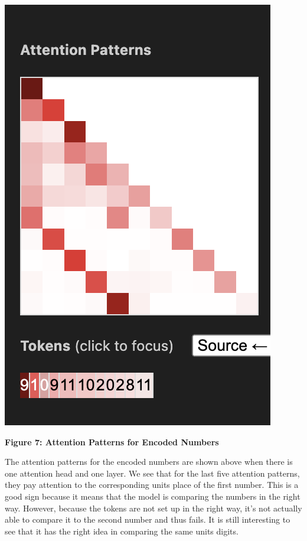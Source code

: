 \documentclass{article}
\begin{document}
\begin{center}
    \includegraphics[scale=0.4]{images/att_encoding3.png}

    \textbf{Figure 7: Attention Patterns for Encoded Numbers}
\end{center}

The attention patterns for the encoded numbers are shown above when there is one attention head and one layer. We see that for the last five attention patterns, they pay attention to the corresponding units place of the first number. This is a good sign because it means that the model is comparing the numbers in the right way. However, because the tokens are not set up in the right way, it's not actually able to compare it to the second number and thus fails. It is still interesting to see that it has the right idea in comparing the same units digits. 
\end{document}
